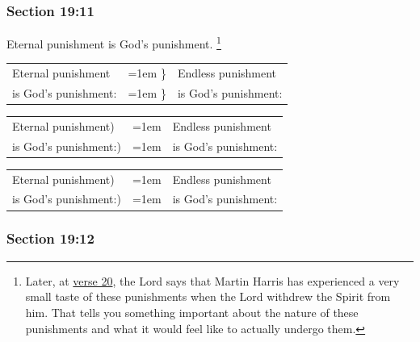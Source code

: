 	\subsubsection{Section 19:11} %
		\label{DC19-11}

		Eternal punishment is God's punishment.%
			\footnote{%
				Later, at \hyperref[DC19-20]{verse 20}, the Lord says that Martin Harris has experienced a very small taste of these punishments when the Lord withdrew the Spirit from him. That tells you something important about the nature of these punishments and what it would feel like to actually undergo them.
				}

		\begin{framed}
		\scriptsize
			\begin{compactdesc}
				\item[JSP] \phantom{.}
					
					\begin{tabular}{p{1in}>{\hangindent=1em}p{0.2in}p{2.0in}<{\raggedright}}
					Eternal punishment & \} & Endless punishment \\
					is God's punishment: & \} & is God's punishment:
					\end{tabular}
				
				\item[RB1] [\textit{missing}]
				\item[DC 1835] \phantom{.}
					
					\begin{tabular}{p{1in}>{\hangindent=1em}p{0.2in}p{2.0in}<{\raggedright}}
					Eternal punishment) & \phantom{.} & Endless punishment \\
					is God's punishment:) & \phantom{.} & is God's punishment:
					\end{tabular}
					
				\item[DC 1844] \phantom{.}
					
					\begin{tabular}{p{1in}>{\hangindent=1em}p{0.2in}p{2.0in}<{\raggedright}}
					Eternal punishment) & \phantom{.} & Endless punishment \\
					is God's punishment:) & \phantom{.} & is God's punishment:
					\end{tabular}
			\end{compactdesc}
		\end{framed}

	\subsubsection{Section 19:12} %
		\label{DC19-12}

